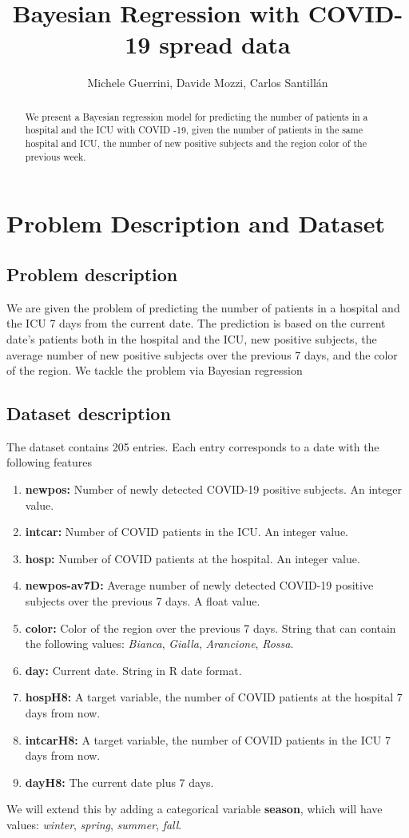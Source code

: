 \documentclass[12pt,a4paper]{article}
\title{Bayesian Regression with COVID-19 spread data}
\author{Michele Guerrini, Davide Mozzi, Carlos Santillán}
\theoremstyle{definition}
\theoremstyle{remark}
\begin{document}
	\maketitle
	\begin{abstract}
		We present a Bayesian regression model for predicting the number of patients in a hospital and the ICU with COVID -19, given the number of patients in the same hospital and ICU, the number of new positive subjects and the region color of the previous week. 
	\end{abstract}
	
	\tableofcontents
	\newpage
	\section{Problem Description and Dataset}
	\subsection{Problem description}
	We are given the problem of predicting the number of patients in a hospital and the ICU 7 days from the current date. The prediction is based on the current date's patients both in the hospital and the ICU, new positive subjects, the average number of new positive subjects over the previous 7 days, and the color of the region. We tackle the problem via Bayesian regression
	\subsection{Dataset description}
	The dataset contains 205 entries. Each entry corresponds to a date with the following features
	\begin{enumerate}
		\item \textbf{newpos:} Number of newly detected COVID-19 positive subjects. An integer value.
		\item \textbf{intcar:} 	Number of COVID patients in the ICU. An integer value.
		\item \textbf{hosp:} Number of COVID patients at the hospital. An integer value.
		\item \textbf{newpos-av7D:} Average number of newly detected COVID-19 positive subjects over the previous 7 days. A float value.
		\item \textbf{color:} Color of the region over the previous 7 days. String that can contain the following values: \textit{Bianca}, \textit{Gialla}, \textit{Arancione}, \textit{Rossa}.
		\item \textbf{day:} Current date. String in R date format.
		\item \textbf{hospH8:} A target variable, the number of COVID patients at the hospital 7 days from now.
		\item \textbf{intcarH8:} A target variable, the number of COVID patients in the ICU 7 days from now.
		\item \textbf{dayH8:} The current date plus 7 days. 
	\end{enumerate}
	We will extend this by adding a categorical variable \textbf{season}, which will have values: \textit{winter}, \textit{spring}, \textit{summer}, \textit{fall}.
\end{document}
